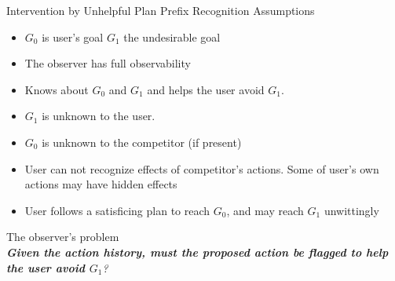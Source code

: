 \begin{frame}{Intervention by Unhelpful Plan Prefix Recognition}
Assumptions
\begin{itemize}
\item $G_0$ is user's goal $G_1$ the  undesirable goal
\item The observer has full observability
\item Knows about $G_0$ and $G_1$ and helps the user avoid $G_1$. 
\item $G_1$ is unknown to the user. 
\item $G_0$ is unknown to the competitor (if present)
\item User can not recognize effects of competitor's actions. Some of user's own actions may have hidden effects
\item User follows a satisficing plan to reach $G_0$, and may reach $G_1$ unwittingly
\end{itemize}
The observer's problem \\
\textit{\textbf{Given the action history, must the proposed action be flagged to help the user avoid $G_1$}?}
\end{frame}